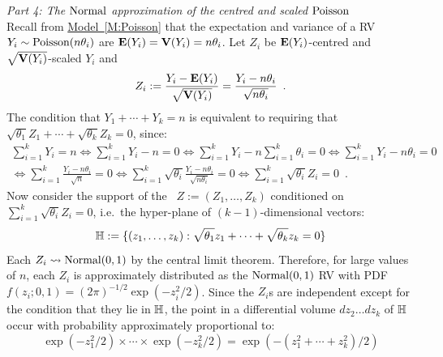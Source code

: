 {\em Part 4: The $\mbox{{\rm Normal}}$ approximation of the centred and scaled $\mbox{{\rm Poisson}}$}\\
Recall from \hyperref[M:Poisson]{Model~\ref*{M:Poisson}} that the expectation and variance of a RV $Y_i \sim \mbox{{\rm Poisson}}(n\theta_i)$ are $\mathbf{E}(Y_i)=\mathbf{V}(Y_i)=n\theta_i$.  Let $Z_i$ be $\mathbf{E}(Y_i)$-centred and $\sqrt{\mathbf{V}(Y_i)}$-scaled $Y_i$ and \[
Z_i :=  \frac{Y_i - \mathbf{E}(Y_i)}{\sqrt{\mathbf{V}(Y_i)}} = \frac{Y_i - n \theta_i}{\sqrt{n \theta_i}} \enspace .
\]
The condition that $Y_1+\cdots+Y_k=n$ is equivalent to requiring that $\sqrt{\theta_1} Z_1 +\cdots+\sqrt{\theta_k} Z_k = 0$, since:
\begin{multline*}
\sum_{i=1}^k {Y_i} =n 
\iff \sum_{i=1}^k {Y_i} -n = 0
\iff \sum_{i=1}^k {Y_i} - n \sum_{i=1}^k {\theta_i} = 0
\iff \sum_{i=1}^k {Y_i - n \theta_i} = 0 \\
\iff \sum_{i=1}^k  \frac{Y_i - n \theta_i}{\sqrt{n }} = 0
\iff \sum_{i=1}^k \sqrt{\theta_i} \frac{Y_i - n \theta_i}{\sqrt{n \theta_i}} = 0
\iff \sum_{i=1}^k \sqrt{\theta_i} Z_i = 0 \enspace .
\end{multline*}
Now consider the support of the \rv~$Z:=(Z_1,\ldots,Z_k)$ conditioned on $\sum_{i=1}^k \sqrt{\theta_i} Z_i = 0$, i.e.~the hyper-plane of $(k-1)$-dimensional vectors:
\[
\mathbb{H} := \{ (z_1,\ldots,z_k) : \sqrt{\theta_1} z_1 +\cdots+\sqrt{\theta_k} z_k = 0 \} 
\]
Each $Z_i \rightsquigarrow \mbox{{\rm Normal}}(0,1)$ by the central limit theorem.  Therefore, for large values of $n$, each $Z_i$ is approximately distributed as the $\mbox{{\rm Normal}}(0,1)$ RV with PDF $f(z_i;0,1)=(2\pi)^{-1/2}\exp(-z_i^2/2)$.  Since the $Z_i$s are independent except for the condition that they lie in $\mathbb{H}$, the point in a differential volume $dz_2\ldots dz_k$ of $\mathbb{H}$ occur with probability approximately proportional to:
 \[
 \exp(-z_1^2/2) \times \cdots \times \exp(-z_k^2/2)  = \exp(-(z_1^2+\cdots+z_k^2)/2)
 \]

